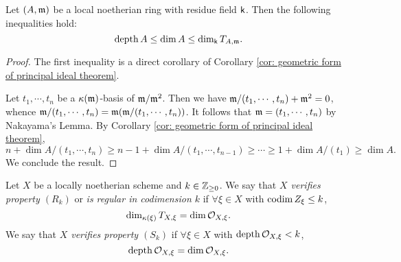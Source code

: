     \begin{proposition}\label{prop: inequality of depth, dimension and dimension of tangent space}
        Let $(A,{\mathfrak{m}})$ be a local noetherian ring with residue field ${\mathsf{k}}$.
        Then the following inequalities hold:
        \[ \operatorname{depth} A \leq \dim A \leq \dim_{\mathsf{k}} T_{A,{\mathfrak{m}}}. \]
    \end{proposition}
    \begin{proof}
        The first inequality is a direct corollary of Corollary \ref{cor: geometric form of principal ideal theorem}.

        Let $t_1,\cdots,t_n$ be a ${\kappa}({\mathfrak{m}})$-basis of ${\mathfrak{m}}/{\mathfrak{m}}^2$.
        Then we have ${\mathfrak{m}}/(t_1,\cdots,t_n)+{\mathfrak{m}}^2 = 0$, whence ${\mathfrak{m}}/(t_1,\cdots,t_n) = {\mathfrak{m}}({\mathfrak{m}}/(t_1,\cdots,t_n))$.
        It follows that ${\mathfrak{m}} = (t_1,\cdots,t_n)$ by Nakayama's Lemma.
        By Corollary \ref{cor: geometric form of principal ideal theorem}, 
        \[ n + \dim A/(t_1,\cdots,t_n) \geq n-1 + \dim A/(t_1,\cdots,t_{n-1}) \geq \cdots \geq 1 + \dim A/(t_1) \geq \dim A. \]  
        We conclude the result.
    \end{proof}

    \begin{definition}\label{def: regular and Serre's conditions}
        Let $X$ be a locally noetherian scheme and $k \in {\mathbb{Z}}_{\geq 0}$.
        We say that \textit{$X$ verifies property $(R_k)$} or \textit{is regular in codimension $k$} if $\forall \xi \in X$ with $\operatorname{codim} Z_\xi \leq k$, 
        \[ \dim_{{\kappa}(\xi)} T_{X,\xi} = \dim {\mathcal{O}}_{X,\xi}. \]
        We say that \textit{$X$ verifies property $(S_k)$} if $\forall \xi \in X$ with $\operatorname{depth} {\mathcal{O}}_{X,\xi} < k$,
        \[ \operatorname{depth} {\mathcal{O}}_{X,\xi} = \dim {\mathcal{O}}_{X,\xi}. \]        
    \end{definition}


